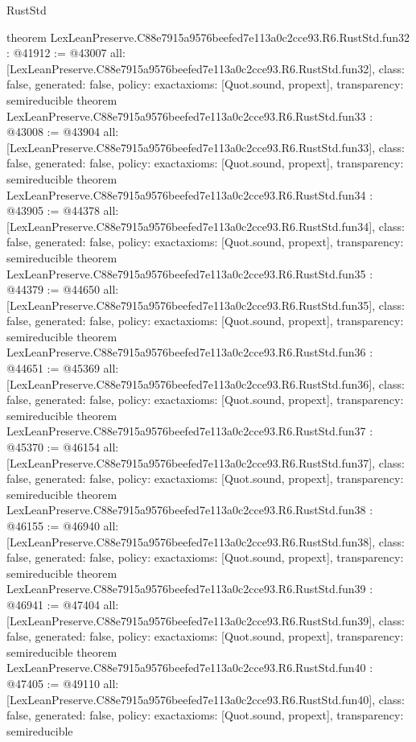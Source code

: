 \begin{lexlean}{RustStd}
\begin{coremodule}
{}
theorem LexLeanPreserve.C88e7915a9576beefed7e113a0c2cce93.R6.RustStd.fun32 : @41912 := @43007 {
  all: [LexLeanPreserve.C88e7915a9576beefed7e113a0c2cce93.R6.RustStd.fun32],
  class: false,
  generated: false,
  policy: exact{axioms: [Quot.sound, propext]},
  transparency: semireducible
}
theorem LexLeanPreserve.C88e7915a9576beefed7e113a0c2cce93.R6.RustStd.fun33 : @43008 := @43904 {
  all: [LexLeanPreserve.C88e7915a9576beefed7e113a0c2cce93.R6.RustStd.fun33],
  class: false,
  generated: false,
  policy: exact{axioms: [Quot.sound, propext]},
  transparency: semireducible
}
theorem LexLeanPreserve.C88e7915a9576beefed7e113a0c2cce93.R6.RustStd.fun34 : @43905 := @44378 {
  all: [LexLeanPreserve.C88e7915a9576beefed7e113a0c2cce93.R6.RustStd.fun34],
  class: false,
  generated: false,
  policy: exact{axioms: [Quot.sound, propext]},
  transparency: semireducible
}
theorem LexLeanPreserve.C88e7915a9576beefed7e113a0c2cce93.R6.RustStd.fun35 : @44379 := @44650 {
  all: [LexLeanPreserve.C88e7915a9576beefed7e113a0c2cce93.R6.RustStd.fun35],
  class: false,
  generated: false,
  policy: exact{axioms: [Quot.sound, propext]},
  transparency: semireducible
}
theorem LexLeanPreserve.C88e7915a9576beefed7e113a0c2cce93.R6.RustStd.fun36 : @44651 := @45369 {
  all: [LexLeanPreserve.C88e7915a9576beefed7e113a0c2cce93.R6.RustStd.fun36],
  class: false,
  generated: false,
  policy: exact{axioms: [Quot.sound, propext]},
  transparency: semireducible
}
theorem LexLeanPreserve.C88e7915a9576beefed7e113a0c2cce93.R6.RustStd.fun37 : @45370 := @46154 {
  all: [LexLeanPreserve.C88e7915a9576beefed7e113a0c2cce93.R6.RustStd.fun37],
  class: false,
  generated: false,
  policy: exact{axioms: [Quot.sound, propext]},
  transparency: semireducible
}
theorem LexLeanPreserve.C88e7915a9576beefed7e113a0c2cce93.R6.RustStd.fun38 : @46155 := @46940 {
  all: [LexLeanPreserve.C88e7915a9576beefed7e113a0c2cce93.R6.RustStd.fun38],
  class: false,
  generated: false,
  policy: exact{axioms: [Quot.sound, propext]},
  transparency: semireducible
}
theorem LexLeanPreserve.C88e7915a9576beefed7e113a0c2cce93.R6.RustStd.fun39 : @46941 := @47404 {
  all: [LexLeanPreserve.C88e7915a9576beefed7e113a0c2cce93.R6.RustStd.fun39],
  class: false,
  generated: false,
  policy: exact{axioms: [Quot.sound, propext]},
  transparency: semireducible
}
theorem LexLeanPreserve.C88e7915a9576beefed7e113a0c2cce93.R6.RustStd.fun40 : @47405 := @49110 {
  all: [LexLeanPreserve.C88e7915a9576beefed7e113a0c2cce93.R6.RustStd.fun40],
  class: false,
  generated: false,
  policy: exact{axioms: [Quot.sound, propext]},
  transparency: semireducible
}
\end{coremodule}
\end{lexlean}
